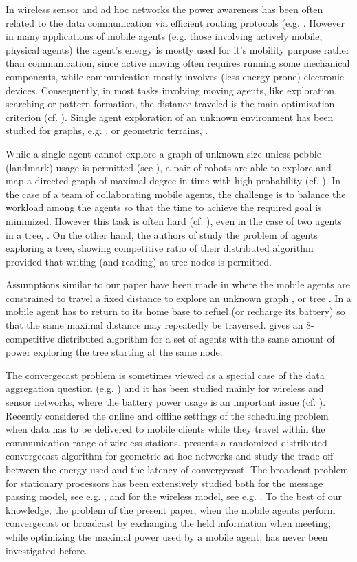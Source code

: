 \documentclass{article}
\newcommand\convergecast{convergecast\xspace}
\newcommand\broadcast{broadcast\xspace}
\begin{document}
In wireless sensor and ad hoc networks the power awareness has been often related to the data communication via efficient routing protocols (e.g. \cite{Ambuhl,SL}. However in many applications of mobile agents (e.g. those involving actively mobile, physical agents) the agent's energy is mostly used for it's mobility purpose rather than communication, since active moving often requires running some mechanical components, while communication mostly involves (less energy-prone) electronic devices.
Consequently, in most tasks involving moving agents, like exploration, searching or pattern formation, the distance traveled is the main optimization criterion (cf. \cite{AH,AG,ABRS,BCR,BeRS,BlRS,DP,DKS,FGKP,MMS}). Single agent exploration of an unknown environment has been studied for graphs, e.g. \cite{AH,DP}, or geometric terrains, \cite{BCR,BlRS}. 

While a single agent cannot explore a graph of unknown size unless pebble (landmark) usage is permitted (see \cite{BFRSV}), a pair of robots are able to explore and map a directed graph of maximal degree  in  time with high probability (cf. \cite{BS}). In the case of a team of collaborating mobile agents, the challenge is to balance the workload among the agents so that the time to achieve the required goal is minimized. However this task is often hard (cf. \cite{FHK}), even in the case of two agents in a tree, \cite{AB}. On the other hand, the authors of \cite{FGKP} study the problem of agents exploring a tree, showing  competitive ratio of their distributed algorithm provided that writing (and reading) at tree nodes is permitted. 

Assumptions similar to our paper have been made in \cite{ABRS,BlRS,DKS} where the mobile agents are constrained to travel a fixed distance to explore an unknown graph \cite{ABRS,BlRS}, or tree \cite{DKS}. In \cite{ABRS,BlRS} a mobile agent has to return to its home base to refuel (or recharge its battery) so that the same maximal distance may repeatedly be traversed. \cite{DKS} gives an 8-competitive distributed algorithm for a set of agents  with the same amount of power exploring the tree starting at the same node.

The {\convergecast} problem is sometimes viewed as a special case of the data aggregation question (e.g. \cite{KEW,RV}) and it has been studied mainly for wireless and sensor networks, where the battery power usage is an important issue (cf. \cite{KK,AGS}). Recently \cite{CJABL} considered the online and offline settings of the scheduling problem when data has to be delivered to mobile clients while they travel within the communication range of wireless stations. \cite{KK} presents a randomized distributed {\convergecast} algorithm for geometric ad-hoc networks and study the trade-off between the energy used and the latency of {\convergecast}. The \broadcast problem for stationary processors has been extensively studied both for the message passing model, see e.g. \cite{AGP}, and for the wireless model, see e.g. \cite{BGI}. To the best of our knowledge, the problem of the present paper, when the mobile agents perform {\convergecast} or broadcast by exchanging the held information when meeting, while optimizing the maximal power used by a mobile agent, has never been investigated before. 
\end{document}
